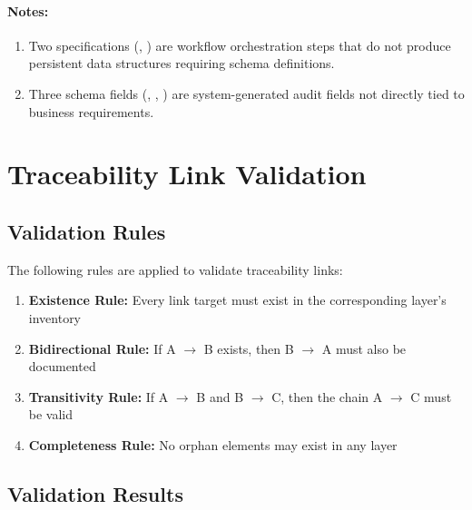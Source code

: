 \paragraph{Notes:}
\begin{enumerate}
  \item Two specifications (, ) are
        workflow orchestration steps that do not produce persistent data
        structures requiring schema definitions.
  \item Three schema fields (, ,
        ) are system-generated audit fields not
        directly tied to business requirements.
\end{enumerate}

\section{Traceability Link Validation}
\label{sec:link-validation}

\subsection{Validation Rules}

The following rules are applied to validate traceability links:

\begin{enumerate}
  \item \textbf{Existence Rule:} Every link target must exist in the
        corresponding layer's inventory
  \item \textbf{Bidirectional Rule:} If A $\rightarrow$ B exists, then
        B $\rightarrow$ A must also be documented
  \item \textbf{Transitivity Rule:} If A $\rightarrow$ B and B $\rightarrow$ C,
        then the chain A $\rightarrow$ C must be valid
  \item \textbf{Completeness Rule:} No orphan elements may exist in any layer
\end{enumerate}

\subsection{Validation Results}

